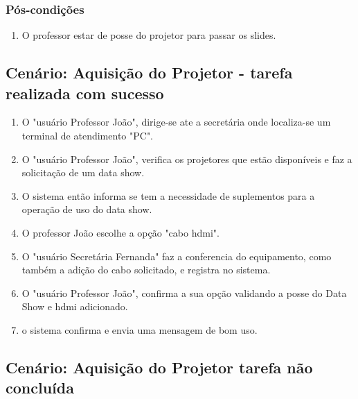 \subsubsection{Pós-condições}

\begin{enumerate}

  \item O professor estar de posse do projetor para passar os slides. 

\end{enumerate}


\subsection{Cenário: Aquisição do Projetor - tarefa realizada com sucesso}

\begin{enumerate}

  \item O "usuário Professor João", dirige-se ate a secretária onde localiza-se
    um terminal de atendimento "PC".

  \item O "usuário Professor João", verifica os projetores que estão disponíveis
    e faz a solicitação de um data show.

  \item O sistema então informa se tem a necessidade de suplementos para a
    operação de uso do data show. 
    
  \item O professor João escolhe a opção "cabo hdmi".

  \item O "usuário Secretária Fernanda" faz a conferencia do equipamento, como
    também a adição do cabo solicitado, e registra no sistema. 
  
  \item O "usuário Professor João", confirma a sua opção validando a posse do
    Data Show e hdmi adicionado. 

  \item o sistema confirma e envia uma mensagem de bom uso. 

\end{enumerate}

\subsection{Cenário: Aquisição do Projetor tarefa não concluída}

